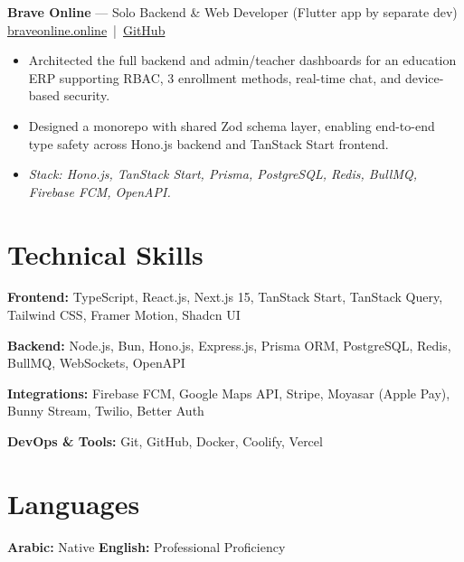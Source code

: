 \documentclass[10pt, letterpaper]{article}
\newenvironment{highlights}{
    \begin{itemize}[
        topsep=0.08cm,
        parsep=0.08cm,
        partopsep=0pt,
        itemsep=0pt,
        leftmargin=10pt
    ]
}{
    \end{itemize}
}
\begin{document}
\vspace{0.15cm}

\textbf{Brave Online} — Solo Backend \& Web Developer (Flutter app by separate dev) \hfill \href{https://braveonline.online}{braveonline.online} \,|\, \href{https://github.com/ahmed-hamada-dev/show-cases/blob/main/braveonlin.online/brave-online-README.md}{GitHub}
\begin{highlights}
    \item Architected the full backend and admin/teacher dashboards for an education ERP supporting RBAC, 3 enrollment methods, real-time chat, and device-based security.
    \item Designed a monorepo with shared Zod schema layer, enabling end-to-end type safety across Hono.js backend and TanStack Start frontend.
    \item \textit{Stack: Hono.js, TanStack Start, Prisma, PostgreSQL, Redis, BullMQ, Firebase FCM, OpenAPI.}
\end{highlights}

\vspace{0.15cm}







\section{Technical Skills}

\textbf{Frontend:} TypeScript, React.js, Next.js 15, TanStack Start, TanStack Query, Tailwind CSS, Framer Motion, Shadcn UI

\vspace{0.08cm}

\textbf{Backend:} Node.js, Bun, Hono.js, Express.js, Prisma ORM, PostgreSQL, Redis, BullMQ, WebSockets, OpenAPI

\vspace{0.08cm}

\textbf{Integrations:} Firebase FCM, Google Maps API, Stripe, Moyasar (Apple Pay), Bunny Stream, Twilio, Better Auth

\vspace{0.08cm}

\textbf{DevOps \& Tools:} Git, GitHub, Docker, Coolify, Vercel







\section{Languages}

\textbf{Arabic:} Native \hfill
\textbf{English:} Professional Proficiency
\end{document}
